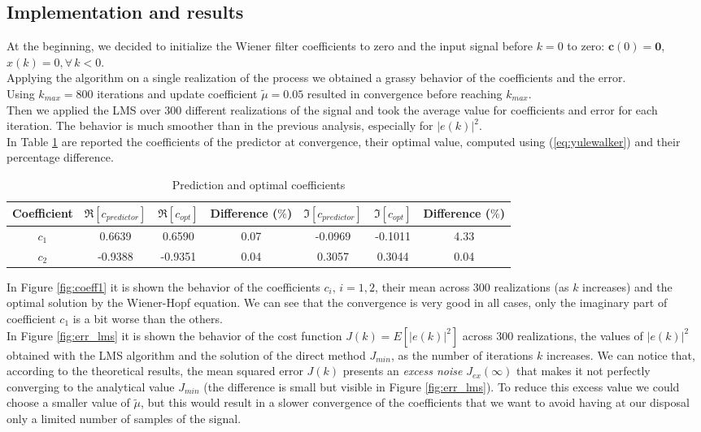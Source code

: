 \documentclass[a4paper, 12pt]{report}
\begin{document}
\subsection*{Implementation and results}
At the beginning, we decided to initialize the Wiener filter coefficients to zero and the input signal before $k=0$ to zero: $\mathbf{c}(0) = \mathbf{0}$, $x(k) = 0, \forall \, k<0$. \\
Applying the algorithm on a single realization of the process we obtained a grassy behavior of the coefficients and the error.\\
Using $k_{max} = 800$ iterations and update coefficient $\tilde{\mu} = 0.05$ resulted in convergence before reaching $k_{max}$.\\
Then we applied the LMS over 300 different realizations of the signal and took the average value for coefficients and error for each iteration. The behavior is much smoother than in the previous analysis, especially for $|e(k)|^2$.\\
In Table \ref{tab:predopt} are reported the coefficients of the predictor at convergence, their optimal value, computed using (\ref{eq:yulewalker}) and their percentage difference.

\begin{table}[H]
	\centering
	\begin{tabular}{c|cc|c|cc|c}
	\toprule
	Coefficient	& $\Re[c_{predictor}]$ 	& $\Re[c_{opt}]$	& Difference ($\%$)	& $\Im[c_{predictor}]$	& $\Im[c_{opt}]$ & Difference ($\%$) \\
	\midrule
	$c_1$ 	& 0.6639	& 0.6590		& 0.07 & -0.0969	& -0.1011	& 4.33 \\
	$c_2$	& -0.9388	& -0.9351		& 0.04 & 0.3057		& 0.3044 	& 0.04 \\
	\bottomrule
	\end{tabular}
	\caption{Prediction and optimal coefficients}
	\label{tab:predopt}
\end{table}

In Figure \ref{fig:coeff1} it is shown the behavior of the coefficients $c_i, \, i=1,2$,  their mean across 300 realizations (as $k$ increases) and the optimal solution by the Wiener-Hopf equation. We can see that the convergence is very good in all cases, only the imaginary part of coefficient $c_1$ is a bit worse than the others.\\
In Figure \ref{fig:err_lms} it is shown the behavior of the cost function $J(k) = E \left[ |e(k)|^2 \right]$  across 300 realizations, the values of $|e(k)|^2$ obtained with the LMS algorithm and the solution of the direct method $J_{min}$, as the number of iterations $k$ increases. We can notice that, according to the theoretical results, the mean squared error $J(k)$ presents an \emph{excess noise} $J_{ex}(\infty)$ that makes it not perfectly converging to the analytical value $J_{min}$ (the difference is small but visible in Figure \ref{fig:err_lms}). To reduce this excess value we could choose a smaller value of $\tilde{\mu}$, but this would result in a slower convergence of the coefficients that we want to avoid having at our disposal only a limited number of samples of the signal.
\end{document}

